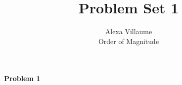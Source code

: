 \documentclass[12pt]{article}
\begin{document}
 
 \title{Problem Set 1}
\author{Alexa Villaume\\ 
Order of Magnitude} 
 
\maketitle

\noindent \textbf{Problem 1} 
\end{document}
